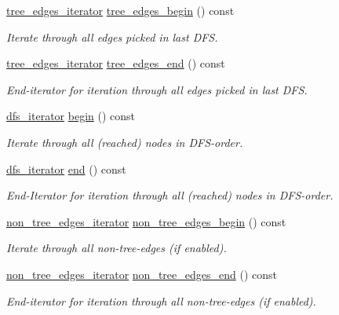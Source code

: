 \begin{DoxyCompactItemize}
\mbox{\hyperlink{classdfs_a0eee0ddec5343c05f617d6d7aabb6d19}{tree\+\_\+edges\+\_\+iterator}} \mbox{\hyperlink{classdfs_afe193938a05b114870c19163731273c8}{tree\+\_\+edges\+\_\+begin}} () const
\begin{DoxyCompactList}\small\item\em Iterate through all edges picked in last D\+FS. \end{DoxyCompactList}\item 
\mbox{\hyperlink{classdfs_a0eee0ddec5343c05f617d6d7aabb6d19}{tree\+\_\+edges\+\_\+iterator}} \mbox{\hyperlink{classdfs_ad1b9f759569cb52ba7ee415862c79831}{tree\+\_\+edges\+\_\+end}} () const
\begin{DoxyCompactList}\small\item\em End-\/iterator for iteration through all edges picked in last D\+FS. \end{DoxyCompactList}\item 
\mbox{\hyperlink{classdfs_ad040ddae37492e18c8e029406d667bd9}{dfs\+\_\+iterator}} \mbox{\hyperlink{classdfs_ab06650dd8cbd5e76b0c73b71458ec5ec}{begin}} () const
\begin{DoxyCompactList}\small\item\em Iterate through all (reached) nodes in D\+F\+S-\/order. \end{DoxyCompactList}\item 
\mbox{\hyperlink{classdfs_ad040ddae37492e18c8e029406d667bd9}{dfs\+\_\+iterator}} \mbox{\hyperlink{classdfs_af847633fa642258d3522e8deb26aef37}{end}} () const
\begin{DoxyCompactList}\small\item\em End-\/\+Iterator for iteration through all (reached) nodes in D\+F\+S-\/order. \end{DoxyCompactList}\item 
\mbox{\hyperlink{classdfs_ae7301f3d4417e60fb3a499180375194e}{non\+\_\+tree\+\_\+edges\+\_\+iterator}} \mbox{\hyperlink{classdfs_a4efe5bb72d00305e6b226e67c2b2ef6e}{non\+\_\+tree\+\_\+edges\+\_\+begin}} () const
\begin{DoxyCompactList}\small\item\em Iterate through all non-\/tree-\/edges (if enabled). \end{DoxyCompactList}\item 
\mbox{\hyperlink{classdfs_ae7301f3d4417e60fb3a499180375194e}{non\+\_\+tree\+\_\+edges\+\_\+iterator}} \mbox{\hyperlink{classdfs_ad9cd92a18bda23edca8ab3ac60a15ef4}{non\+\_\+tree\+\_\+edges\+\_\+end}} () const
\begin{DoxyCompactList}\small\item\em End-\/iterator for iteration through all non-\/tree-\/edges (if enabled). \end{DoxyCompactList}\item 

\end{DoxyCompactItemize}
